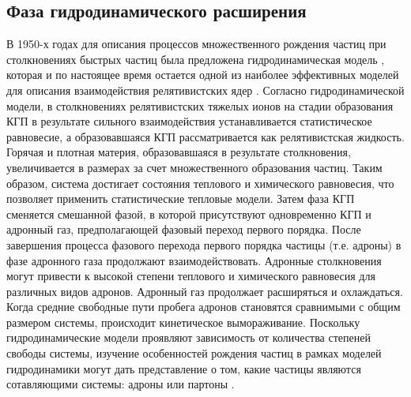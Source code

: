 \subsection{Фаза гидродинамического расширения} \label{ch1/hydro}
В 1950-х годах для описания процессов множественного рождения частиц при столкновениях быстрых частиц была предложена гидродинамическая модель \cite{HydroLandau}, которая и по настоящее время остается одной из наиболее эффективных моделей для описания взаимодействия релятивистских ядер \cite{HydroPartonicCascade, Flow1, Flow2}.
Согласно гидродинамической модели, в столкновениях релятивистских тяжелых ионов на стадии образования КГП в результате сильного взаимодействия устанавливается статистическое равновесие, а образовавшаяся КГП рассматривается как релятивистская жидкость.
Горячая и плотная материя, образовавшаяся в результате столкновения, увеличивается в размерах за счет множественного образования частиц.
Таким образом, система достигает состояния теплового и химического равновесия, что позволяет применить статистические тепловые модели.
Затем фаза КГП сменяется смешанной фазой, в которой присутствуют одновременно КГП и адронный газ, предполагающей фазовый переход первого порядка. После завершения процесса фазового перехода первого порядка частицы (т.е. адроны) в фазе адронного газа продолжают взаимодействовать. Адронные столкновения могут привести к высокой степени теплового и химического равновесия для различных видов адронов. Адронный газ продолжает расширяться и охлаждаться. Когда средние свободные пути пробега адронов становятся сравнимыми с общим размером системы, происходит кинетическое вымораживание.
Поскольку гидродинамические модели проявляют зависимость от количества степеней свободы системы, изучение особенностей рождения частиц в рамках моделей гидродинамики могут дать представление о том, какие частицы являются сотавляющими системы: адроны или партоны \cite{Flow1, Flow2}.

